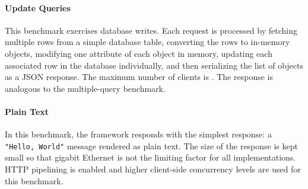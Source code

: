 
\paragraph{Update Queries}
This benchmark exercises database writes.
Each request is processed by fetching multiple rows from a simple database table, converting the rows to in-memory objects, modifying one attribute of each object in memory, updating each associated row in the database individually, and then serializing the list of objects as a JSON response.
The maximum number of clients is .
The response is analogous to the multiple-query benchmark.

\paragraph{Plain Text}
In this benchmark, the framework responds with the simplest response: a \texttt{"Hello, World"} message rendered as plain text.
The size of the response is kept small so that gigabit Ethernet is not the limiting factor for all implementations.
HTTP pipelining is enabled and higher client-side concurrency levels are used for this benchmark.

